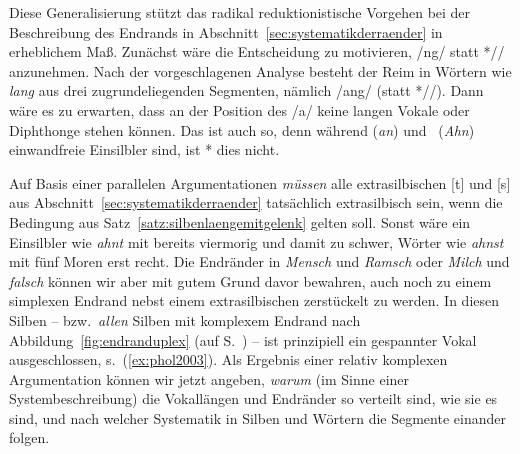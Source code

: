 Diese Generalisierung stützt das radikal reduktionistische Vorgehen bei der Beschreibung des Endrands in Abschnitt~\ref{sec:systematikderraender} in erheblichem Maß.
Zunächst wäre die Entscheidung zu motivieren, /ng/ statt *// anzunehmen.
Nach der vorgeschlagenen Analyse besteht der Reim in Wörtern wie \textit{lang} aus drei zugrundeliegenden Segmenten, nämlich /ang/ (statt *//).
Dann wäre es zu erwarten, dass an der Position des /a/ keine langen Vokale oder Diphthonge stehen können.
Das ist auch so, denn während \textipa{[Pan]} (\textit{an}) und\ \textipa{[Pa:n]} (\textit{Ahn}) einwandfreie Einsilbler sind, ist *\textipa{[Pa:N]} dies nicht.

Auf Basis einer parallelen Argumentationen \textit{müssen} alle extrasilbischen [t] und [s] aus Abschnitt~\ref{sec:systematikderraender} tatsächlich extrasilbisch sein, wenn die Bedingung aus Satz~\ref{satz:silbenlaengemitgelenk} gelten soll.
Sonst wäre ein Einsilbler wie \textit{ahnt} mit \textipa{[Pa:nt]} bereits viermorig und damit zu schwer, Wörter wie \textit{ahnst} mit fünf Moren erst recht.
Die Endränder in \textit{Mensch} und \textit{Ramsch} oder \textit{Milch} und \textit{falsch} können wir aber mit gutem Grund davor bewahren, auch noch zu einem simplexen Endrand nebst einem extrasilbischen \textipa{[S]} zerstückelt zu werden.
In diesen Silben -- bzw.\ \textit{allen} Silben mit komplexem Endrand nach Abbildung~\ref{fig:endranduplex} (auf S.~\pageref{fig:endranduplex}) -- ist prinzipiell ein gespannter Vokal ausgeschlossen, s.\ (\ref{ex:phol2003}).
Als Ergebnis einer relativ komplexen Argumentation können wir jetzt angeben, \textit{warum} (im Sinne einer Systembeschreibung) die Vokallängen und Endränder so verteilt sind, wie sie es sind, und nach welcher Systematik in Silben und Wörtern die Segmente einander folgen.

\begin{exe}
  \ex \label{ex:phol2003}
  \begin{xlist}
  	\ex *\textipa{[mE:nS]}
  	\ex *\textipa{[ra:mS]}
  	\ex *\textipa{[mi:l\c{c}]}
  	\ex *\textipa{[fa:lS]}
  \end{xlist}
\end{exe}

